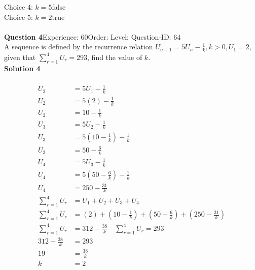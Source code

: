 \documentclass{article}
\begin{document}
Choice 4: \hspace{20pt}$k=5$\hspace{20pt}false\\
Choice 5: \hspace{20pt}$k=2$\hspace{20pt}true\\
\\[4pt]
\noindent\textbf{Question 4}\hspace{20pt}Experience: 60\hspace{20pt}Order: \hspace{20pt}Level: \hspace{20pt}Question-ID: 64\\[2pt]
A sequence is defined by the recurrence relation $U_{n+1}=5U_n-\displaystyle\frac{1}{k},  k>0, U_1=2$, given that $\displaystyle\sum_{r=1}^{4} U_r=293$, find the value of $k$.\\[4pt]
\noindent\textbf{Solution 4}\\[2pt]
\\[-35pt]\begin{align*}
U_2&=5U_1-\displaystyle\frac{1}{k}\\[2pt]
U_2&=5(2)-\displaystyle\frac{1}{k}\\[2pt]
U_2&=10-\displaystyle\frac{1}{k}\\[12pt]
U_3&=5U_2-\displaystyle\frac{1}{k}\\[2pt]
U_3&=5\left(10-\displaystyle\frac{1}{k}\right)-\displaystyle\frac{1}{k}\\[2pt]
U_3&=50-\displaystyle\frac{6}{k}\\[12pt]
U_4&=5U_3-\displaystyle\frac{1}{k}\\[2pt]
U_4&=5\left(50-\displaystyle\frac{6}{k}\right)-\displaystyle\frac{1}{k}\\[2pt]
U_4&=250-\displaystyle\frac{31}{k}\\[12pt]
\displaystyle\sum_{r=1}^{4} U_r&=U_1+U_2+U_3+U_4\\[2pt]
\displaystyle\sum_{r=1}^{4} U_r&=(2)+\left(10-\displaystyle\frac{1}{k}\right)+\left(50-\displaystyle\frac{6}{k}\right)+\left(250-\displaystyle\frac{31}{k}\right)\\[2pt]
\displaystyle\sum_{r=1}^{4} U_r&=312-\displaystyle\frac{38}{k}\quad\displaystyle\sum_{r=1}^{4} U_r=293\\[2pt]
312-\displaystyle\frac{38}{k}&=293\\[2pt]
19&=\displaystyle\frac{38}{k}\\[2pt]
k&=2\\[-30pt]
\end{align*}
\end{document}
